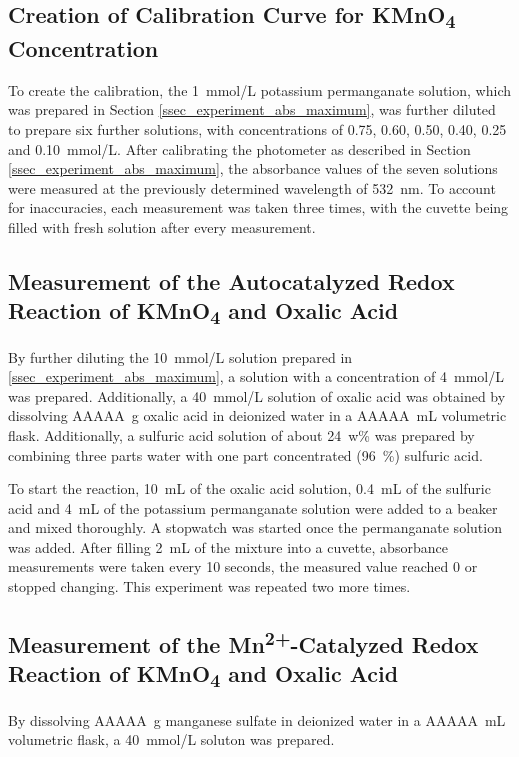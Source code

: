 \documentclass[titlepage]{article}
\begin{document}
\subsection{Creation of Calibration Curve for KMnO\texorpdfstring{\textsubscript{4}}{4} Concentration}
To create the calibration, the 1~mmol/L potassium permanganate solution, which was prepared in Section \ref{ssec_experiment_abs_maximum}, was further diluted to prepare six further solutions, with concentrations of 0.75, 0.60, 0.50, 0.40, 0.25 and 0.10~mmol/L. After calibrating the photometer as described in Section \ref{ssec_experiment_abs_maximum}, the absorbance values of the seven solutions were measured at the previously determined wavelength of 532~nm. To account for inaccuracies, each measurement was taken three times, with the cuvette being filled with fresh solution after every measurement.

\subsection{Measurement of the Autocatalyzed Redox Reaction of KMnO\texorpdfstring{\textsubscript{4}}{4} and Oxalic Acid} \label{ssec_experiment_reaction_autocatalyzed}
By further diluting the 10~mmol/L solution prepared in \ref{ssec_experiment_abs_maximum}, a solution with a concentration of 4~mmol/L was prepared. Additionally, a 40~mmol/L solution of oxalic acid was obtained by dissolving AAAAA~g oxalic acid in deionized water in a AAAAA~mL volumetric flask. Additionally, a sulfuric acid solution of about 24~w\% was prepared by combining three parts water with one part concentrated (96~\%) sulfuric acid.

To start the reaction, 10~mL of the oxalic acid solution, 0.4~mL of the sulfuric acid and 4~mL of the potassium permanganate solution were added to a beaker and mixed thoroughly. A stopwatch was started once the permanganate solution was added. After filling 2~mL of the mixture into a cuvette, absorbance measurements were taken every 10 seconds, the measured value reached 0 or stopped changing. This experiment was repeated two more times.

\subsection{Measurement of the Mn\texorpdfstring{\textsuperscript{2+}}{2+}-Catalyzed Redox Reaction of KMnO\texorpdfstring{\textsubscript{4}}{4} and Oxalic Acid}
By dissolving AAAAA~g manganese sulfate in deionized water in a AAAAA~mL volumetric flask, a 40~mmol/L soluton was prepared.
\end{document}
